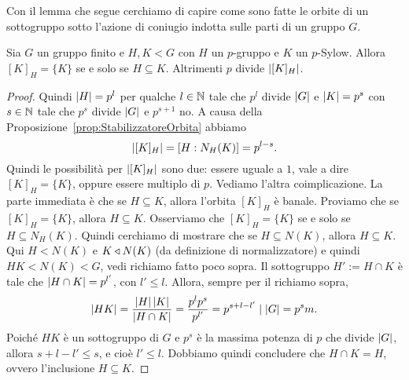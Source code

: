 
Con il lemma che segue cerchiamo di capire come sono fatte le orbite di un sottogruppo sotto l'azione di coniugio indotta sulle parti di un gruppo $G$. %

\begin{lemm}
Sia $G$ un gruppo finito e $H,K < G$ con $H$ un $p$-gruppo e $K$ un $p$-Sylow. Allora $[K]_H = \{K\}$ se e solo se $H \subseteq K$. Altrimenti $p$ divide $\left\lvert[K]_H\right\rvert$.
\end{lemm}

\begin{proof}
Quindi $\left\lvert H\right\rvert = p^l$ per qualche $l \in \mathbb{N}$ tale che $p^l$ divide $\left\lvert G\right\rvert$ e $\left\lvert K\right\rvert = p^s$ con $s \in \mathbb{N}$ tale che $p^s$ divide $\left\lvert G\right\rvert$ e $p^{s+1}$ no.\newline
A causa della Proposizione~\ref{prop:StabilizzatoreOrbita} abbiamo 
\[\left\lvert[K]_H\right\rvert = \left[H:N_H(K)\right] = p^{l-s} .\]
Quindi le possibilità per $\left\lvert[K]_H\right\rvert$ sono due: essere uguale a $1$, vale a dire $[K]_H = \{K\}$, oppure essere multiplo di $p$.\newline
Vediamo l'altra coimplicazione. La parte immediata è che se $H \subseteq K$, allora l'orbita $[K]_H$ è banale. Proviamo che se $[K]_H = \{K\}$, allora $H \subseteq K$. Osserviamo che $[K]_H = \{K\}$ se e solo se $H \subseteq N_H(K)$. Quindi cerchiamo di mostrare che se $H \subseteq N(K)$, allora $H \subseteq K$. Qui $H < N(K)$ e $K \triangleleft N(K)$ (da definizione di normalizzatore) e quindi $HK < N(K) < G$, vedi richiamo fatto poco sopra. Il sottogruppo $H' := H \cap K$ è tale che $\left\lvert H \cap K\right\rvert=p^{l'}$, con $l'\le l$. Allora, sempre per il richiamo sopra,
\[ \left\lvert HK\right\rvert=\frac{\left\lvert H\right\rvert\left\lvert K\right\rvert}{\left\lvert H \cap K\right\rvert}=\frac{p^lp^s}{p^{l'}}=p^{s+l-l'} \mid \left\lvert G\right\rvert=p^s m .\]
Poiché $HK$ è un sottogruppo di $G$ e $p^s$ è la massima potenza di $p$ che divide $\left\lvert G\right\rvert$, allora $s+l-l'\le s$, e cioè $l' \le l$. Dobbiamo quindi concludere che $H \cap K = H$, ovvero l'inclusione $H \subseteq K$.
\end{proof}


